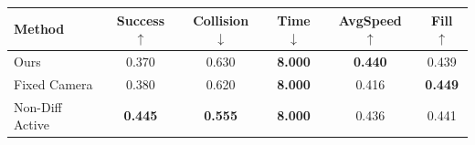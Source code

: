 \begin{tabular}{lccccc}
\toprule
Method & Success $\uparrow$ & Collision $\downarrow$ & Time $\downarrow$ & AvgSpeed $\uparrow$ & Fill $\uparrow$ \\
\midrule
Ours & 0.370 & 0.630 & \textbf{8.000} & \textbf{0.440} & 0.439 \\
Fixed Camera & 0.380 & 0.620 & \textbf{8.000} & 0.416 & \textbf{0.449} \\
Non-Diff Active & \textbf{0.445} & \textbf{0.555} & \textbf{8.000} & 0.436 & 0.441 \\
\bottomrule
\end{tabular}